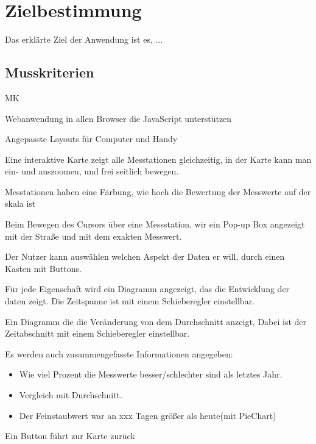 \section{Zielbestimmung}
Das erklärte Ziel der Anwendung ist es, ...

\subsection{Musskriterien}
\setcounter{counter}{10}

\begin{Kriterien}{MK}

	\item Webanwendung in allen Browser die JavaScript unterstützen

	\item Angepasste Layouts für Computer und Handy
	
	\item Eine interaktive Karte zeigt alle Messtationen gleichzeitig, in der Karte kann man ein- und auszoomen, und frei seitlich bewegen.

	\item Messtationen haben eine Färbung, wie hoch die Bewertung der Messwerte auf der skala ist
	
	\item Beim Bewegen des Cursors über eine Messstation, wir ein Pop-up Box angezeigt mit der Straße und mit dem exakten Messwert.
	
	\item Der Nutzer kann auswählen welchen Aspekt der Daten er will, durch einen Kasten mit Buttons. 
	
	\item Für jede Eigenschaft wird ein Diagramm angezeigt, das die Entwicklung der daten zeigt. Die Zeitspanne ist mit einem Schieberegler einstellbar.
	
	\item Ein Diagramm die die Veränderung von dem Durchschnitt anzeigt, Dabei ist der Zeitabschnitt mit einem Schieberegler einstellbar.
	
	\item Es werden auch zusammengefasste Informationen angegeben: 
		\begin{itemize}
		 \item Wie viel Prozent die Messwerte besser/schlechter sind als letztes Jahr.
        \item Vergleich mit Durchschnitt.
        \item Der Feinstaubwert war an xxx Tagen größer als heute(mit PieChart)
		\end{itemize}
		
	\item Ein Button führt zur Karte zurück
 
\end{Kriterien}

